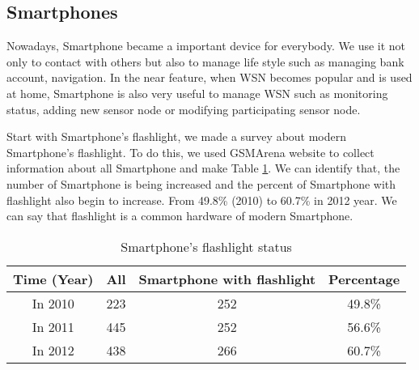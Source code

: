 \subsection{Smartphones}

Nowadays, Smartphone became a important device for everybody. We use it not only to contact with others but also to manage life style such as managing bank account, navigation. In the near feature, when WSN becomes popular and is used at home, Smartphone is also very useful to manage WSN such as monitoring status, adding new sensor node or modifying participating sensor node.
 
Start with Smartphone's flashlight, we made a survey about modern Smartphone's flashlight. To do this, we used GSMArena website \cite{gsmgarena} to collect information about all Smartphone and make Table \ref{tab:flashlight}. We can identify that, the number of Smartphone is being increased and the percent of Smartphone with flashlight also begin to increase. From 49.8\% (2010) to 60.7\% in 2012 year. We can say that flashlight is a common hardware of modern Smartphone.

\begin{table}[htbp]
\caption{Smartphone's flashlight status}
\begin{center}
\begin{tabular}{|c|c|c|c|}
	\hline
	Time (Year) 	& All 	& Smartphone with flashlight & Percentage\\
	\hline
	In 2010	& 223	& 252 & 49.8\%\\
	\hline	
	In 2011	& 445	& 252 &56.6\%\\
	\hline	
	In 2012		& 438	& 266 & 60.7\% \\	
	\hline	
\end{tabular}
\end{center}
\label{tab:flashlight}
\end{table}%


